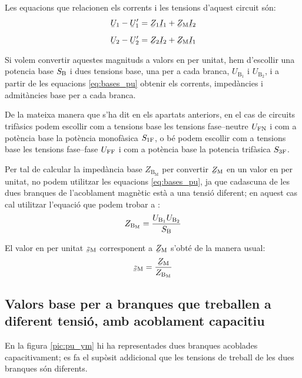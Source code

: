 Les equacions que relacionen els corrents i les tensions d'aquest circuit són:
\begin{subequations}
\begin{align}
    \cmplx{U}_1 - \cmplx{U}'_1 &= \cmplx{Z}_1 \cmplx{I}_1 + \cmplx{Z}\ped{M} \cmplx{I}_2   \\[2mm]
    \cmplx{U}_2 - \cmplx{U}'_2 &= \cmplx{Z}_2 \cmplx{I}_2 + \cmplx{Z}\ped{M} \cmplx{I}_1
\end{align}
\end{subequations}

Si volem convertir aquestes magnituds a valors en per unitat, hem d'escollir  una potencia base $S_\mathrm{B}$ i dues tensions base, una  per a cada branca, $U_{\text{B}_1}$ i  $U_{\text{B}_2}$, i a partir de les equacions \eqref{eq:bases_pu} obtenir els corrents, impedàncies i admitàncies base per a cada branca.

De la mateixa manera que s'ha dit en els apartats anteriors, en el cas de circuits trifàsics podem escollir com a tensions base les tensions fase--neutre $U_\mathrm{FN}$ i com a potència base la potència  monofàsica $S_\mathrm{1F}$, o bé podem escollir com a tensions base les tensions fase--fase $U_\mathrm{FF}$ i com a potència base la potencia trifàsica $S_\mathrm{3F}$.


Per tal de calcular la impedància base $Z_{\text{B}_\text{M}}$ per convertir $\cmplx{Z}\ped{M}$ en un valor en per unitat, no podem utilitzar les equacions \eqref{eq:bases_pu}, ja que cadascuna de les dues branques de l'acoblament magnètic està a una tensió diferent; en aquest cas cal utilitzar l'equació que podem trobar a \cite{TLE}:
\begin{equation}
    Z_{\text{B}_\text{M}} = \frac{U_{\text{B}_1} U_{\text{B}_2}} {S_\mathrm{B}}
\end{equation}

El valor en per unitat $\cmplx{z}\ped{M}$ corresponent a $\cmplx{Z}\ped{M}$ s'obté de la manera usual:
\begin{equation}
    \cmplx{z}\ped{M} = \frac{\cmplx{Z}\ped{M}}{Z_{\text{B}_\text{M}}}
\end{equation}


\subsection{Valors base per a branques que treballen a diferent tensió, amb acoblament capacitiu}

En la figura \vref{pic:pu_ym} hi ha representades dues branques acoblades capacitivament; es fa el supòsit addicional que les tensions de treball de les dues branques són diferents.

